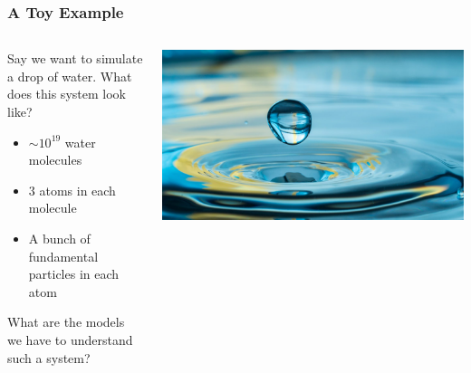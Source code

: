 \documentclass[aspectratio=169, 12pt]{beamer}
\begin{document}
\begin{frame}

    \frametitle{A Toy Example}

    \begin{columns}
    \begin{column}{.6\textwidth}
        Say we want to simulate a drop of water. 
        What does this system look like?
    
        \begin{itemize}
            \item $\sim10^{19}$ water molecules
            \item $3$ atoms in each molecule
            \item A bunch of fundamental particles in each atom
        \end{itemize}
    
        What are the models we have to understand such a system?
    \end{column}
    \begin{column}{.4\textwidth}
        \includegraphics[scale=0.15]{images/water-droplet.jpg}
    \end{column}
    \end{columns}

\end{frame}
\end{document}
